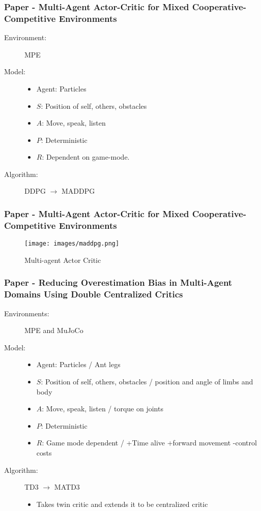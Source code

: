 \documentclass{beamer}
\begin{document}
\begin{frame}
    \frametitle{Paper \thepapercounter - Multi-Agent Actor-Critic for Mixed 
    Cooperative-Competitive Environments}
    \begin{description}
        \item[Environment:] MPE
        \item[Model:]
        \begin{itemize} \small
            \item Agent: Particles
            \item $S$: Position of self, others, obstacles
            \item $A$: Move, speak, listen
            \item $P$: Deterministic
            \item $R$: Dependent on game-mode. 
        \end{itemize}
        \item[Algorithm:] DDPG $\rightarrow$ MADDPG
    \end{description}
\end{frame}

\begin{frame}
    \frametitle{Paper \thepapercounter - Multi-Agent Actor-Critic for Mixed 
    Cooperative-Competitive Environments\cite{lowe2020}}
    \begin{figure}\small
        \texttt{[image: images/maddpg.png]}
        \caption{Multi-agent Actor Critic\cite{lowe2020}}
    \end{figure}
\end{frame}

\begin{frame} %
    \frametitle{Paper \thepapercounter - Reducing Overestimation Bias in Multi-Agent Domains 
    Using Double Centralized Critics}
    \begin{description}
        \item[Environments:] MPE and MuJoCo 
        \item[Model:]
        \begin{itemize}
            \item Agent:  Particles / Ant legs
            \item $S$: Position of self, others, obstacles / position and angle of limbs and body
            \item $A$: Move, speak, listen / torque on joints
            \item $P$: Deterministic
            \item $R$: Game mode dependent / +Time alive +forward movement -control costs
        \end{itemize}
        \item[Algorithm:] TD3 $\rightarrow$ MATD3
        \begin{itemize}
            \item Takes twin critic and extends it to be centralized critic
        \end{itemize}
    \end{description}
\end{frame}
\end{document}
